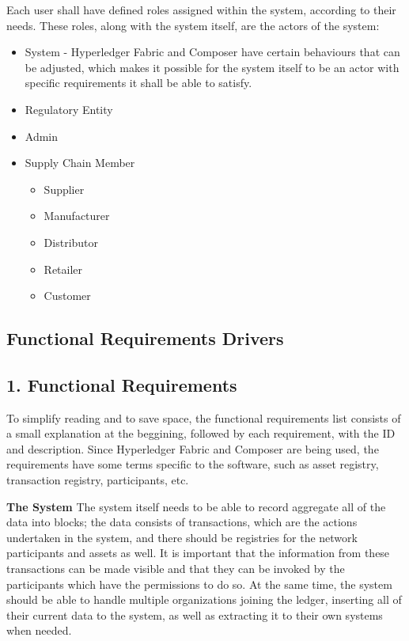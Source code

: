 	Each user shall have defined roles assigned within the system, according to their needs. These roles, along with the system itself, are the actors of the system:
		\begin{itemize}
			\item System - Hyperledger Fabric and Composer have certain behaviours that can be adjusted, which makes it possible for the system itself to be an actor with specific requirements it shall be able to satisfy.
			\item Regulatory Entity
			\item Admin
			\item Supply Chain Member
			\begin{itemize}
				\item Supplier  %
				\item  Manufacturer
				\item Distributor
				\item Retailer
				\item Customer
		\end{itemize}
	\end{itemize}
\subsection{Functional Requirements Drivers}
	
\subsection*{1. Functional  Requirements}

To simplify reading and to save space, the functional requirements list consists of a small explanation at the beggining, followed by each requirement, with the ID and description. Since Hyperledger Fabric and Composer are being used, the requirements have some terms specific to the software, such as asset registry, transaction registry, participants, etc.

		\par \textbf{The System}
		 The system itself needs to be able to record aggregate all of the data into blocks; the data consists of transactions, which are the actions undertaken in the system, and there should be registries for the network participants and assets as well. It is important that the information from these transactions can be made visible and that they can be invoked by the participants which have the permissions to do so. At the same time, the system should be able to handle multiple organizations joining the ledger, inserting all of their current data to the system, as well as extracting it to their own systems when needed. 
		

